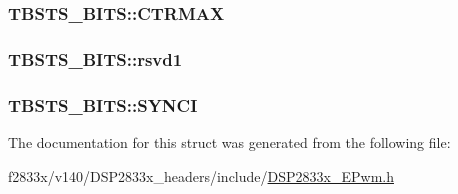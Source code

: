 \subsubsection[{C\+T\+R\+M\+A\+X}]{ T\+B\+S\+T\+S\+\_\+\+B\+I\+T\+S\+::\+C\+T\+R\+M\+A\+X}\label{struct_t_b_s_t_s___b_i_t_s_acc2c468bdd1013da5c8a8ec143a95656}
\hypertarget{struct_t_b_s_t_s___b_i_t_s_a2da0d8461457e5ab1b477bac21961dcc}{}
\subsubsection[{rsvd1}]{ T\+B\+S\+T\+S\+\_\+\+B\+I\+T\+S\+::rsvd1}\label{struct_t_b_s_t_s___b_i_t_s_a2da0d8461457e5ab1b477bac21961dcc}
\hypertarget{struct_t_b_s_t_s___b_i_t_s_ac7a61291a04c2082310d8e75cd7beeef}{}
\subsubsection[{S\+Y\+N\+C\+I}]{ T\+B\+S\+T\+S\+\_\+\+B\+I\+T\+S\+::\+S\+Y\+N\+C\+I}\label{struct_t_b_s_t_s___b_i_t_s_ac7a61291a04c2082310d8e75cd7beeef}


The documentation for this struct was generated from the following file\+:\begin{DoxyCompactItemize}
\item 
f2833x/v140/\+D\+S\+P2833x\+\_\+headers/include/\hyperlink{_d_s_p2833x___e_pwm_8h}{D\+S\+P2833x\+\_\+\+E\+Pwm.\+h}\end{DoxyCompactItemize}
